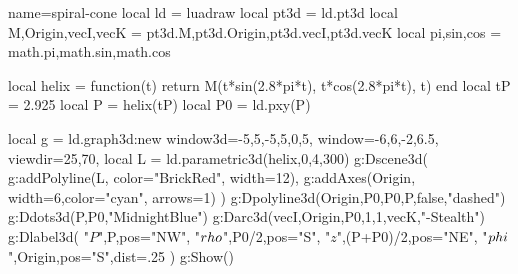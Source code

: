 \documentclass{standalone}
\begin{document}
\begin{luadraw}{name=spiral-cone}
local ld = luadraw
local pt3d = ld.pt3d
local M,Origin,vecI,vecK = pt3d.M,pt3d.Origin,pt3d.vecI,pt3d.vecK
local pi,sin,cos = math.pi,math.sin,math.cos

local helix = function(t)
  return M(t*sin(2.8*pi*t), t*cos(2.8*pi*t), t)
end
local tP = 2.925
local P = helix(tP)
local P0 = ld.pxy(P)

local g = ld.graph3d:new{
  window3d={-5,5,-5,5,0,5},
  window={-6,6,-2,6.5},
  viewdir={25,70},
}
local L = ld.parametric3d(helix,0,4,300)
g:Dscene3d(
    g:addPolyline(L, {color="BrickRed", width=12}),
    g:addAxes(Origin, {width=6,color="cyan", arrows=1})
)
g:Dpolyline3d({{Origin,P0},{P0,P}},false,"dashed")
g:Ddots3d({P,P0},"MidnightBlue")
g:Darc3d(vecI,Origin,P0,1,1,vecK,"-Stealth")
g:Dlabel3d(
    "$P$",P,{pos="NW"},
    "$\\rho$",P0/2,{pos="S"},
    "$z$",(P+P0)/2,{pos="NE"},
    "$\\phi$",Origin,{pos="S",dist=.25}
)
g:Show()
\end{luadraw}
\end{document}
